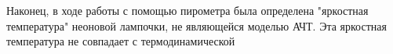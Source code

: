 \documentclass[15pt,a5paper,reqno]{article}
\begin{document}

Наконец, в ходе работы с помощью пирометра была определена "яркостная температура" неоновой лампочки, не являющейся моделью АЧТ. Эта яркостная температура не совпадает с термодинамической
\end{document}
